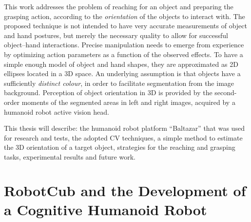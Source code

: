 This work addresses the problem of reaching for an object and preparing the grasping action, according to the \emph{orientation} of the objects to interact with. The proposed technique is not intended to have very accurate measurements of object and hand postures, but merely the necessary quality to allow for successful object--hand interactions. Precise manipulation needs to emerge from experience by optimizing action parameters as a function of the observed effects. To have a simple enough model of object and hand shapes, they are approximated as 2D ellipses located in a 3D space. An underlying assumption is that objects have a sufficiently \emph{distinct colour}, in order to facilitate segmentation from the image background. Perception of object orientation in 3D is provided by the second-order moments of the segmented areas in left and right images, acquired by a humanoid robot active vision head.

This thesis will describe: the humanoid robot platform ``Baltazar'' that was used for research and tests, the adopted \ac{CV} techniques, a simple method to estimate the 3D orientation of a target object, strategies for the reaching and grasping tasks, experimental results and future work.

\section[RobotCub]{RobotCub and the Development of a Cognitive Humanoid Robot}

